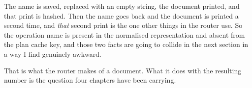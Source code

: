 The name is saved, replaced with an empty string, the document printed, and that
print is hashed. Then the name goes back and the document is printed a second
time, and \emph{that} second print is the one other things in the router use. So
the operation name is present in the normalised representation and absent from
the plan cache key, and those two facts are going to collide in the next
section in a way I find genuinely awkward.

\medskip
That is what the router makes of a document. What it does with the resulting
number is the question four chapters have been carrying.

%
